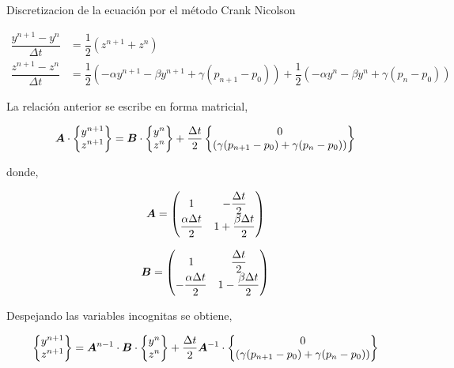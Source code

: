 Discretizacion de la ecuación por el método Crank Nicolson

\begin{align}
\dfrac{y^{n+1}-y^n}{\Delta t} & = \dfrac{1}{2} \left( z^{n+1} + z^n \right) \\
\dfrac{z^{n+1}-z^n}{\Delta t} &= \dfrac{1}{2} \left( -\alpha y^{n+1} - \beta y^{n+1} + \gamma (p_{n+1}-p_0) \right) + \dfrac{1}{2} \left( -\alpha y^{n} - \beta y^{n} + \gamma (p_{n}-p_0) \right)  
\end{align}

La relación anterior se escribe en forma matricial,

\begin{equation}
\boldsymbol{A} \cdot
\begin{Bmatrix}
y^{n+1} \\ z^{n+1}
\end{Bmatrix} =
\boldsymbol{B} \cdot
\begin{Bmatrix}
y^n \\ z^n
\end{Bmatrix} + \dfrac{\Delta t}{2}
\begin{Bmatrix}
0 \\ \left( \gamma (p_{n+1}-p_0) + \gamma (p_{n}-p_0) \right)
\end{Bmatrix}
\end{equation}

donde,

\begin{equation}
\boldsymbol{A} = \begin{pmatrix}
1 & -\dfrac{\Delta t}{2} \\
\dfrac{\alpha \Delta t}{2} & 1+ \dfrac{\beta \Delta t}{2}
\end{pmatrix} 
\end{equation}

\begin{equation}
\boldsymbol{B} = \begin{pmatrix}
1 & \dfrac{\Delta t}{2} \\
-\dfrac{\alpha \Delta t}{2} & 1-\dfrac{\beta \Delta t}{2}
\end{pmatrix}
\end{equation}

Despejando las variables incognitas se obtiene,

\begin{equation}
\begin{Bmatrix}
y^{n+1} \\ z^{n+1} 
\end{Bmatrix} =
\boldsymbol{A}^{n-1} \cdot \boldsymbol{B} \cdot 
\begin{Bmatrix}
y^n \\ z^n 
\end{Bmatrix} + \dfrac{\Delta t}{2} \boldsymbol{A}^{-1} \cdot
\begin{Bmatrix}
0 \\ \left( \gamma (p_{n+1}-p_0) + \gamma (p_{n}-p_0) \right)
\end{Bmatrix}
\end{equation}

